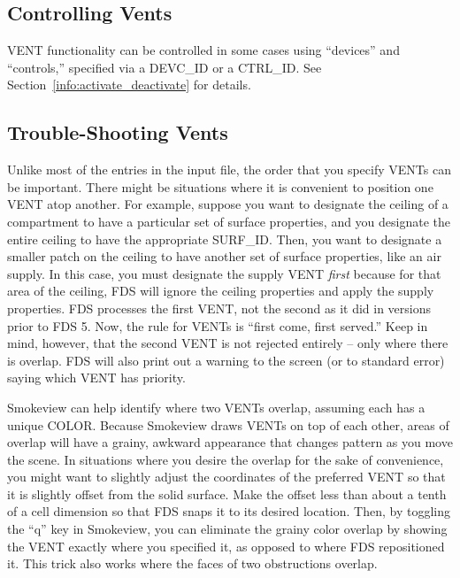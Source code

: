 \documentclass[11pt]{book}
\begin{document}
\subsection{Controlling Vents}

{\ct VENT} functionality can be controlled in some cases using ``devices'' and ``controls,'' specified via a {\ct DEVC\_ID} or a {\ct CTRL\_ID}.
See Section~\ref{info:activate_deactivate} for details.

\subsection{Trouble-Shooting Vents}
\label{info:VENT_Trouble}

Unlike most of the entries in the input file, the order that you specify {\ct VENT}s can be important. There might be
situations where it is convenient to position one {\ct VENT} atop another. For example, suppose you want to designate the
ceiling of a compartment to have a particular set of surface properties, and you designate the entire ceiling to have the
appropriate {\ct SURF\_ID}. Then, you want to designate a smaller patch on the ceiling to have another set of surface
properties, like an air supply. In this case, you must designate the supply {\ct VENT} {\em first} because for that area
of the ceiling, FDS will ignore the ceiling properties and apply the supply properties. FDS processes the first {\ct VENT}, not
the second as it did in versions prior to FDS 5. Now, the rule for {\ct VENT}s is ``first come, first served.''
Keep in mind, however, that the
second {\ct VENT} is not rejected entirely -- only where there is overlap. FDS will also print out a warning to the screen (or to
standard error) saying which {\ct VENT} has priority.

Smokeview can help identify where two {\ct VENT}s overlap, assuming each has a unique {\ct COLOR}. Because Smokeview draws {\ct VENT}s
on top of each other, areas of overlap will have a grainy, awkward appearance that changes pattern as you move the scene. In situations
where you desire the overlap for the sake of convenience, you might want to slightly adjust the coordinates of the preferred {\ct VENT}
so that it is slightly offset from the solid surface. Make the offset less than about a tenth of a cell dimension so that FDS snaps it
to its desired location. Then, by toggling the ``q'' key in Smokeview, you can eliminate the grainy color overlap by showing the
{\ct VENT} exactly where you specified it, as opposed to where FDS repositioned it. This trick also works where the faces of two
obstructions overlap.
\end{document}
